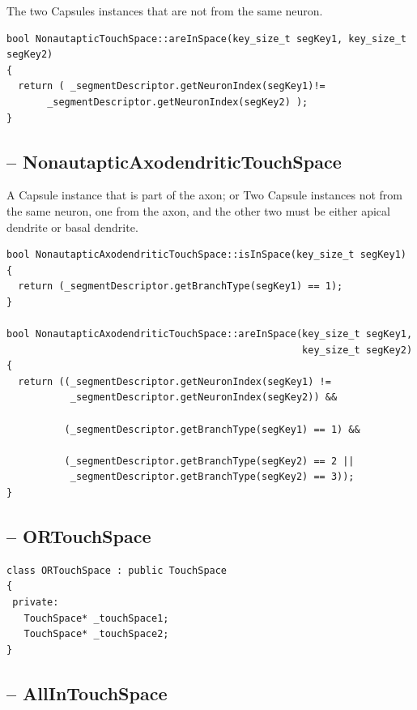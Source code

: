 The two Capsules instances that are not from the same neuron.

\begin{verbatim}
bool NonautapticTouchSpace::areInSpace(key_size_t segKey1, key_size_t segKey2)
{
  return ( _segmentDescriptor.getNeuronIndex(segKey1)!= 
	   _segmentDescriptor.getNeuronIndex(segKey2) );
}
\end{verbatim}

\subsection{-- NonautapticAxodendriticTouchSpace}
\label{sec:NonautapticAxodendriticTouchSpace}

A Capsule instance that is part of the axon; or
Two Capsule instances not from the same neuron, one from the axon, and the other
two must be either apical dendrite or basal dendrite.

\begin{verbatim}
bool NonautapticAxodendriticTouchSpace::isInSpace(key_size_t segKey1)
{
  return (_segmentDescriptor.getBranchType(segKey1) == 1);
}

bool NonautapticAxodendriticTouchSpace::areInSpace(key_size_t segKey1,
                                                   key_size_t segKey2)
{
  return ((_segmentDescriptor.getNeuronIndex(segKey1) !=
           _segmentDescriptor.getNeuronIndex(segKey2)) &&

          (_segmentDescriptor.getBranchType(segKey1) == 1) &&

          (_segmentDescriptor.getBranchType(segKey2) == 2 ||
           _segmentDescriptor.getBranchType(segKey2) == 3));
}
\end{verbatim}

\subsection{-- ORTouchSpace}
\label{sec:ORTouchSpace}

\begin{verbatim}
class ORTouchSpace : public TouchSpace
{
 private:
   TouchSpace* _touchSpace1;
   TouchSpace* _touchSpace2;
}
\end{verbatim}

\subsection{-- AllInTouchSpace}
\label{sec:AllInTouchSpace}


